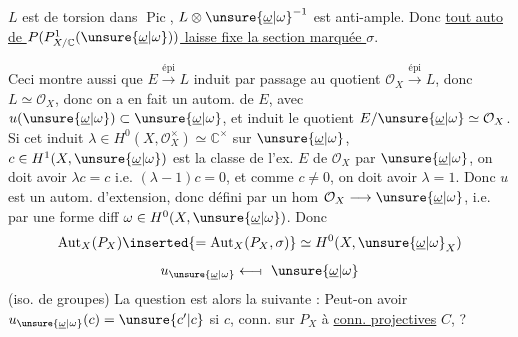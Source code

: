 $L$ est de torsion dans $\operatorname{Pic}$, $L\otimes\unsure{\underline{\omega}|\omega}^{-1}$ est anti-ample. Donc \uline{tout auto}  \uline{de $P(P^1_{X/\mathbb C}(\unsure{\underline{\omega}|\omega}))$ laisse fixe la section marquée $\sigma$}.


Ceci montre aussi  que $E\xrightarrow{\mathrm{épi}}L$ induit par passage au quotient $\mathcal O_X\xrightarrow{\mathrm{épi}}L$, donc $L\simeq\mathcal O_X$, donc on a en fait un autom. de $E$, avec $u(\unsure{\underline{\omega}|\omega})\subset\unsure{\underline{\omega}|\omega}$, et induit   le quotient $E/\unsure{\underline{\omega}|\omega}\simeq\mathcal O_X$. Si cet  induit $\lambda\in H^0(X,\mathcal O_X^\times)\simeq\mathbb C^\times$ sur $\unsure{\underline{\omega}|\omega}$,  $c\in H^1(X,\unsure{\underline{\omega}|\omega})$ est la classe de l'ex. $E$ de $\mathcal O_X$ par $\unsure{\underline{\omega}|\omega}$, on doit avoir $\lambda c=c$ i.e. $(\lambda-1)c=0$, et comme $c\ne0$, on doit avoir $\lambda=1$. Donc $u$ est un autom. d'extension, donc défini par un hom $\mathcal O_X\longrightarrow\unsure{\underline{\omega}|\omega}$, i.e. par une forme diff $\omega\in H^0(X,\unsure{\underline{\omega}|\omega})$. Donc
\[
\operatorname{Aut}_X(P_X)\inserted{=\operatorname{Aut}_X(P_X,\sigma)}\simeq H^0(X,\unsure{\underline{\omega}|\omega}_X)
\]
\[
u_{\unsure{\underline{\omega}|\omega}}\longleftarrow\!\shortmid\ \unsure{\underline{\omega}|\omega}
\]
(iso. de groupes) La question est alors la suivante : Peut-on avoir $u_{\unsure{\underline{\omega}|\omega}}(c)=\unsure{c'|c}$ si $c$,  conn. sur $P_X$  à  \uline{conn. projectives} $C$,  ?
